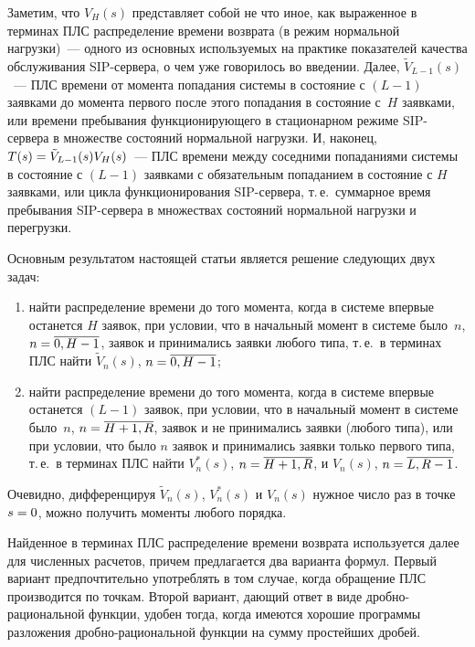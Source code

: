 \begin{multicols}{2}
Заметим, что $V_H(s)$ представляет собой не что иное, как выраженное
в терминах ПЛС распределение времени возврата (в режим нормальной
нагрузки)~--- одного из основных используемых на практике
показателей качества обслуживания SIP-сер\-ве\-ра, о чем уже говорилось
во введении. Далее, $\tilde{V}_{L-1}(s)$~--- ПЛС времени от момента
попадания сис\-те\-мы в со\-сто\-яние с $(L-1)$ заявками до момента первого
после этого попадания в со\-сто\-яние с~$H$ заявками, или времени
пребывания функционирующего в стационарном режиме SIP-сер\-ве\-ра в
множестве состояний нормальной нагрузки. И, наконец, $T(s)\hm=\tilde{V}_{L-1}(s) V_H(s)$~--- 
ПЛС времени между соседними попаданиями
сис\-те\-мы в состояние с $(L-1)$ заявками с обязательным попаданием в
состояние с $H$ заявками, или цикла функционирования SIP-сер\-ве\-ра,
т.\,е.\ суммарное время пребывания SIP-сер\-ве\-ра в множествах
состояний нормальной нагрузки и перегрузки.

Основным результатом настоящей статьи является решение следующих
двух задач:
\begin{enumerate}[(1)]
\item найти распределение времени до того момента, когда
в системе впервые останется $H$ заявок, при условии, что в начальный
момент в системе было~$n$,  $n\hm=\overline{0,H-1}$, заявок и
принимались заявки любого типа, т.\,е.\ в терминах ПЛС найти $\tilde{V}_n(s)$, 
$n\hm=\overline{0,H-1}$;
\item найти распределение времени до
того момента, когда в системе впервые останется $(L-1)$ заявок, при
условии, что в начальный момент в системе было~$n$,
$n\hm=\overline{H+1,R}$, заявок и не принимались заявки (любого типа),
или при условии, что было $n$ заявок и принимались заявки только
первого типа, т.\,е.\ в терминах ПЛС найти $V^*_n(s)$,
$n\hm=\overline{H+1,R}$, и $V_n(s)$, $n\hm=\overline{L,R-1}$.
\end{enumerate}

Очевидно, дифференцируя $\tilde{V}_n(s)$, $V^*_n(s)$ и $V_n(s)$ нужное
число раз в точке $s\hm=0$, можно получить моменты любого порядка.

Найденное в терминах ПЛС распределение времени возврата используется
далее для численных расчетов, причем предлагается два варианта
формул. Первый вариант предпочтительно употреблять в том случае,
когда обращение ПЛС производится по точкам. Второй вариант, дающий
ответ в виде дроб\-но-ра\-ци\-о\-наль\-ной функции, удобен тогда, когда
имеются хорошие программы разложения дробно-рациональной функции на
сумму простейших дробей.


\end{multicols}
